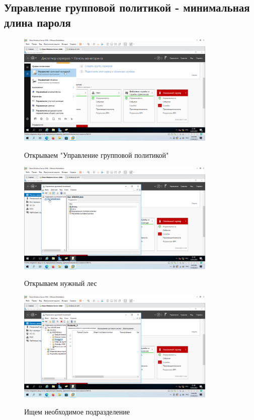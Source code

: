 \documentclass[a4paper]{article}
\begin{document}
  \subsection{Управление групповой политикой - минимальная длина пароля}

  \begin{figure}[H]
    \centering
    \includegraphics[width=0.85\textwidth]{5_0107}
    \label{img:107}
    \caption{Открываем "Управление групповой политикой"}
  \end{figure}

  \begin{figure}[H]
    \centering
    \includegraphics[width=0.85\textwidth]{5_0108}
    \label{img:108}
    \caption{Открываем нужный лес}
  \end{figure}

  \begin{figure}[H]
    \centering
    \includegraphics[width=0.85\textwidth]{5_0109}
    \label{img:109}
    \caption{Ищем необходимое подразделение}
  \end{figure}
\end{document}
